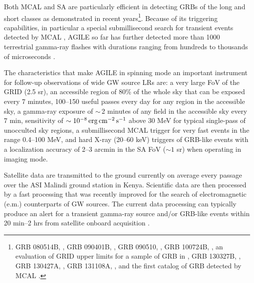 \documentclass[preprint2]{aastex}
\def \mt {}
\begin{document}
Both MCAL and SA are particularly efficient in detecting
GRBs of the long and short classes as demonstrated in recent
years\footnote[2]{GRB 080514B, \cite[][]{2008A&A...491L..25G},
GRB 090401B, \cite[][]{2009GCN..9069....1M}, GRB 090510,
\cite[][]{2010ApJ...708L..84G}, GRB 100724B,
\cite[][]{2011A&A...535A.120D}, an evaluation of GRID upper limits
for a sample of GRB in \cite{2012A&A...547A..95L}, GRB 130327B,
\cite[][]{2013GCN..14344...1L}, GRB 130427A,
\cite[][]{2013GCN..14515...1V}, GRB 131108A,
\cite[][]{2013GCN..15479...1G,2014arXiv1407.0238G}, and the first catalog of GRB detected by MCAL \cite[][]{2013A&A...553A..33G}.}.
%
 Because of its triggering capabilities, in particular a special
submillisecond search for transient events detected by MCAL
\cite[][]{2009NIMPA.598..470L,2009A&A...502..995T}, AGILE so far has further detected 
more than 1000 terrestrial gamma-ray flashes with
durations ranging from hundreds to thousands of microseconds
\cite[][]{2014JGRA..119.1337M,2011PhRvL.106a8501T}.
%
%

The characteristics that make AGILE in spinning mode an important
instrument for follow-up observations of wide GW source LRs are: a
very large FoV of the GRID (2.5 sr), an accessible region of 80\%
of the whole sky that can be exposed every 7 minutes,
 100--150 useful passes every day for any region in the accessible sky, a gamma-ray exposure
of $\sim$\,2 minutes of any field in the accessible sky every 7 min, sensitivity of
$\sim 10^{-8} \, \rm erg \, cm^{-2} \, s^{-1}$ above 30 MeV for typical single-pass
of unocculted sky regions, a submillisecond MCAL trigger for very fast events in
the range 0.4--100 MeV, and hard X-ray (20--60 keV) triggers of GRB-like events with
a localization accuracy of 2--3 arcmin in the SA FoV ($\sim 1$ sr) when operating in
imaging mode.


Satellite data are transmitted to the ground currently on average
every passage over the {\mt ASI} Malindi ground station in Kenya.
Scientific data are then processed by {\mt a } fast processing
{\mt that was recently} improved for the {\mt search of
electromagnetic (e.m.) counterparts of GW sources}. The current
data processing can typically produce an alert for a transient
gamma-ray source and/or GRB-like events within 20 min--2 hrs  from
satellite onboard acquisition \cite[][]{2014ApJ...781...19B,2013NuPhS.239..104P}.
\end{document}
